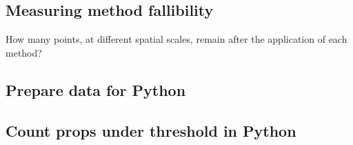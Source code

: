\documentclass[]{article}
\newenvironment{Shaded}{}{}
\newcommand{\CommentTok}[1]{\textcolor[rgb]{0.00,0.50,0.00}{#1}}
\newcommand{\DataTypeTok}[1]{#1}
\newcommand{\DecValTok}[1]{#1}
\newcommand{\KeywordTok}[1]{\textcolor[rgb]{0.00,0.00,1.00}{#1}}
\newcommand{\NormalTok}[1]{#1}
\newcommand{\OperatorTok}[1]{#1}
\newcommand{\StringTok}[1]{\textcolor[rgb]{0.00,0.50,0.50}{#1}}
\begin{document}
\hypertarget{measuring-method-fallibility}{%
\subsection{Measuring method fallibility}\label{measuring-method-fallibility}}

How many points, at different spatial scales, remain after the application of each method?

\hypertarget{prepare-data-for-python}{%
\subsection{Prepare data for Python}\label{prepare-data-for-python}}

\begin{Shaded}
\end{Shaded}

\hypertarget{count-props-under-threshold-in-python}{%
\subsection{Count props under threshold in Python}\label{count-props-under-threshold-in-python}}
\end{document}
